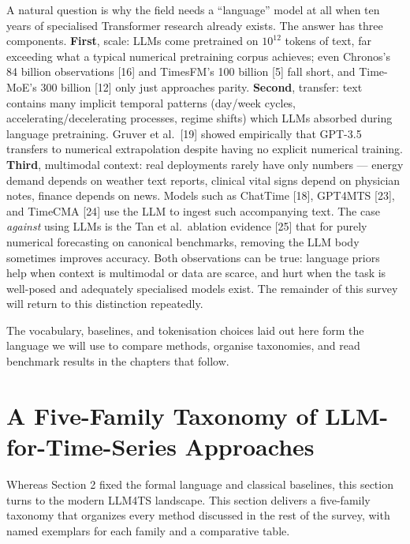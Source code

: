 A natural question is why the field needs a ``language'' model at all when ten years of specialised Transformer research already exists. The answer has three components. \textbf{First}, scale: LLMs come pretrained on \(10^{12}\) tokens of text, far exceeding what a typical numerical pretraining corpus achieves; even Chronos's 84 billion observations {[}16{]} and TimesFM's 100 billion {[}5{]} fall short, and Time-MoE's 300 billion {[}12{]} only just approaches parity. \textbf{Second}, transfer: text contains many implicit temporal patterns (day/week cycles, accelerating/decelerating processes, regime shifts) which LLMs absorbed during language pretraining. Gruver et al.~{[}19{]} showed empirically that GPT-3.5 transfers to numerical extrapolation despite having no explicit numerical training. \textbf{Third}, multimodal context: real deployments rarely have only numbers --- energy demand depends on weather text reports, clinical vital signs depend on physician notes, finance depends on news. Models such as ChatTime {[}18{]}, GPT4MTS {[}23{]}, and TimeCMA {[}24{]} use the LLM to ingest such accompanying text. The case \emph{against} using LLMs is the Tan et al.~ablation evidence {[}25{]} that for purely numerical forecasting on canonical benchmarks, removing the LLM body sometimes improves accuracy. Both observations can be true: language priors help when context is multimodal or data are scarce, and hurt when the task is well-posed and adequately specialised models exist. The remainder of this survey will return to this distinction repeatedly.

The vocabulary, baselines, and tokenisation choices laid out here form the language we will use to compare methods, organise taxonomies, and read benchmark results in the chapters that follow.

\section{A Five-Family Taxonomy of LLM-for-Time-Series Approaches}\label{a-five-family-taxonomy-of-llm-for-time-series-approaches}

Whereas Section 2 fixed the formal language and classical baselines, this section turns to the modern LLM4TS landscape. This section delivers a five-family taxonomy that organizes every method discussed in the rest of the survey, with named exemplars for each family and a comparative table.

